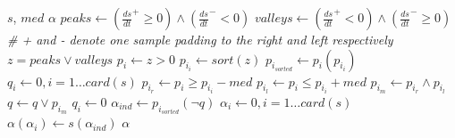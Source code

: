 \begin{algorithmic}[1]
	\renewcommand{\algorithmicrequire}{\textbf{Input:}}
	\renewcommand{\algorithmicensure}{\textbf{Output:}}
	\REQUIRE $s$, $med$
	\ENSURE $\alpha$
	\STATE $peaks \leftarrow \left(\frac{d s}{d t}^+ \geq 0\right) \land \left(\frac{d s}{d t}^- < 0\right)$
	\STATE $valleys \leftarrow \left(\frac{d s}{d t}^+ < 0\right) \land \left(\frac{d s}{d t}^- \geq 0\right)$ \\
	\textit{\scriptsize \# + and - denote one sample padding to the right and left respectively}
	\STATE $z = peaks \lor valleys$
	\STATE $p_i \leftarrow z > 0$
	\STATE $p_{i_i} \leftarrow sort(z)$
	\STATE $p_{i_{sorted}} \leftarrow p_i(p_{i_i})$
	\STATE $q_i \leftarrow 0, i=1\ldots card(s)$
	\STATE $p_{i_r} \leftarrow p_i \geq p_{i_i} - med$
	\STATE $p_{i_l} \leftarrow p_i \leq p_{i_i} + med$
	\STATE $p_{i_m} \leftarrow p_{i_r} \land p_{i_l}$
	\STATE $q \leftarrow q \lor p_{i_m}$
	\STATE $q_i \leftarrow 0$
	\ENDIF
	\ENDFOR
	\STATE $\alpha_{ind} \leftarrow p_{i_{sorted}}(\lnot q)$
	\STATE $\alpha_i \leftarrow 0, i=1\ldots card(s)$
	\STATE $\alpha(\alpha_i) \leftarrow s(\alpha_{ind})$
	\RETURN $\alpha$
\end{algorithmic}
